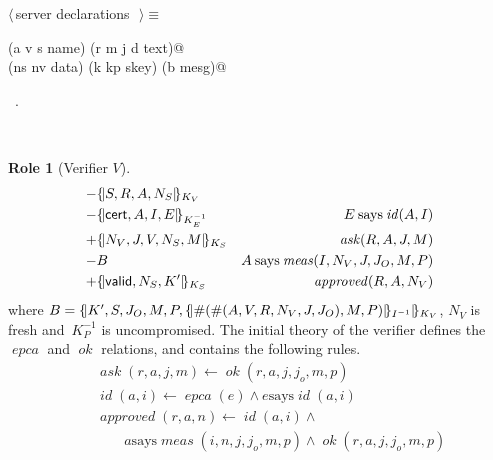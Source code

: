 \documentclass[titlepage,12pt]{article}
\theoremstyle{definition}
\newtheorem{role}{Role}
\newcommand{\inbnd}{\mathord -}
\newcommand{\outbnd}{\mathord +}
\newcommand{\says}{\mathbin{\mathrm{says}}}
\DeclareMathOperator{\ok}{\mathit{ok}}
\DeclareMathOperator{\id}{\mathit{id}}
\DeclareMathOperator{\approved}{\mathit{approved}}
\DeclareMathOperator{\ask}{\mathit{ask}}
\DeclareMathOperator{\meas}{\mathit{meas}}
\DeclareMathOperator{\epca}{\mathit{epca}}
\begin{document}
\begin{flushleft} \small
\begin{minipage}{\linewidth} \label{scrap18}
$\langle\,$server declarations\nobreak\ {\footnotesize {}}$\,\rangle\equiv$
\vspace{-1ex}
\begin{list}{}{} \item
\mbox{}\verb@(a v s name) (r m j d text)@\\
\mbox{}\verb@(ns nv data) (k kp skey) (b mesg)@{\NWsep}
\end{list}
\vspace{-1ex}
\footnotesize\addtolength{\baselineskip}{-1ex}
\begin{list}{}{\setlength{\itemsep}{-\parsep}\setlength{\itemindent}{-\leftmargin}}
\item \NWtxtMacroRefIn\ .
\end{list}
\end{minipage}\\[4ex]
\end{flushleft}
\begin{role}[Verifier $V$]
\begin{eqnarray}
&\inbnd\stova\\
&\inbnd\ptova&E\says\id(A,I)\\
&\outbnd\vtosa&\ask(R,A,J,M)\\
&\inbnd B&A\says\meas(I,N_V,J,J_O,M,P)\\
&\outbnd\vtosb&\approved(R,A,N_V)\label{eq:verifier 4}
\end{eqnarray}
where $B=\{\!|K',S,J_O,M,P, \{\!|\#(\#(A,V,R,N_V,J,J_O),M,P)|\!\}_{I^{-1}}|\!\}_{K_V}$, $N_V$ is fresh and~$K^{-1}_P$ is uncompromised.  The initial
theory of the verifier defines the $\epca$ and $\ok$ relations, and
contains the following rules.
\begin{eqnarray}
&&\ask(r,a,j,m)\gets\ok(r,a,j,j_o,m,p)\label{eq:ask}\\
&&\id(a,i)\gets\epca(e)\land e\says\id(a,i)\label{eq:trust epca}\\
&&\approved(r,a,n)\gets\id(a,i)\land{} \label{eq:approved rule}\\
&&\qquad a\says\meas(i,n,j,j_o,m,p)\land\ok(r,a,j,j_o,m,p) \nonumber
\end{eqnarray}
\end{role}
\end{document}

